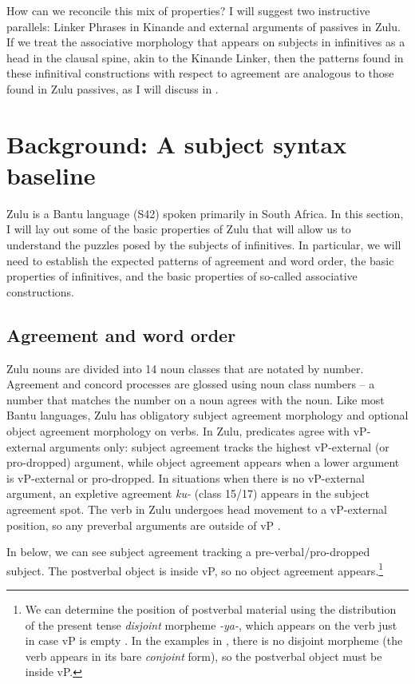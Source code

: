 \documentclass[output=paper,colorlinks,citecolor=brown]{langscibook}
\begin{document}
How can we reconcile this mix of properties? I will suggest two instructive parallels: Linker Phrases in Kinande \citep{BakerCollins2006, Schneider-Zioga2015ACAL, Schneider-Zioga2015WCCFL} and external arguments of passives in Zulu. If we treat the associative morphology that appears on subjects in infinitives as a head in the clausal spine, akin to the Kinande Linker, then the patterns found in these infinitival constructions with respect to agreement are analogous to those found in Zulu passives, as I will discuss in . 

\section{Background: A subject syntax baseline}\label{sec:halpert:2}

Zulu is a Bantu language (S42) spoken primarily in South Africa.  In this section, I will lay out some of the basic properties of Zulu that will allow us to understand the puzzles posed by the subjects of infinitives.  In particular, we will need to establish the expected patterns of agreement and word order, the basic properties of infinitives, and the basic properties of so-called associative constructions.

\subsection{Agreement and word order}\label{sec:halpert:2.1}

Zulu nouns are divided into 14 noun classes that are notated by number. Agreement and concord processes are glossed using  noun class numbers – a number that matches the number on a noun agrees with the noun. Like most Bantu languages, Zulu has obligatory subject agreement morphology and optional object agreement morphology on verbs. In Zulu, predicates agree with vP-external arguments only: subject agreement tracks the highest vP-external (or pro-dropped) argument, while object agreement appears when a lower argument is vP-external or pro-dropped. In situations when there is no vP-external argument, an expletive agreement \textit{ku-} (class 15/17) appears in the subject agreement spot.  The verb in Zulu undergoes head movement to a vP-external position, so any preverbal arguments are outside of vP \citep{Buell2005,Halpert2015}.

In  below, we can see subject agreement tracking a pre-verbal/pro-dropped subject.  The postverbal object is inside vP, so no object agreement appears.\footnote{We can determine the position of postverbal material using the distribution of the present tense \textit{disjoint} morpheme \textit{-ya-}, which appears on the verb just in case vP is empty \citep{Buell2005, Halpert2015, Halpert2017}.  In the examples in , there is no disjoint morpheme (the verb appears in its bare \textit{conjoint} form), so the postverbal object must be inside vP.}
\end{document}
